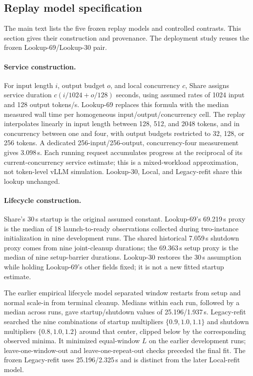 \subsection{Replay model specification}
\label{app:replay-model-specification}
The main text lists the five frozen replay models and controlled contrasts.
This section gives their construction and provenance. The deployment study reuses the frozen
Lookup-69/Lookup-30 pair.

\paragraph{Service construction.}
For input length $i$, output budget $o$, and local concurrency $c$,
Share assigns service duration $c(i/1024+o/128)$ seconds, using assumed rates
of 1024 input and 128 output tokens/s. Lookup-69 replaces this formula with the
median measured wall time per homogeneous input/output/concurrency cell.
The replay interpolates linearly in input length between 128, 512, and
2048 tokens, and in concurrency between one and four, with output budgets
restricted to 32, 128, or 256 tokens. A dedicated 256-input/256-output,
concurrency-four measurement gives 3.098\,s. Each running request accumulates
progress at the reciprocal of its current-concurrency service estimate;
this is a mixed-workload approximation, not token-level vLLM simulation.
Lookup-30, Local, and Legacy-refit share this lookup unchanged.

\paragraph{Lifecycle construction.}
Share's 30\,s startup is the original assumed constant. Lookup-69's 69.219\,s proxy is
the median of 18 launch-to-ready observations collected during two-instance
initialization in nine development runs. The shared historical 7.059\,s shutdown
proxy comes from nine joint-cleanup durations; the 69.363\,s setup proxy is
the median of nine setup-barrier durations. Lookup-30 restores the 30\,s assumption
while holding Lookup-69's other fields fixed; it is not a new fitted startup estimate.

The earlier empirical lifecycle model separated window restarts from setup
and normal scale-in from terminal cleanup. Medians within each run, followed
by a median across runs, gave startup/shutdown values of 25.196/1.937\,s.
Legacy-refit searched the nine combinations of startup multipliers
$\{0.9,1.0,1.1\}$ and shutdown multipliers $\{0.8,1.0,1.2\}$ around that
center, clipped below by the corresponding observed minima. It minimized
equal-window $L$ on the earlier development runs; leave-one-window-out and
leave-one-repeat-out checks preceded the final fit. The frozen Legacy-refit uses
25.196/2.325\,s and is distinct from the later Local-refit model.

